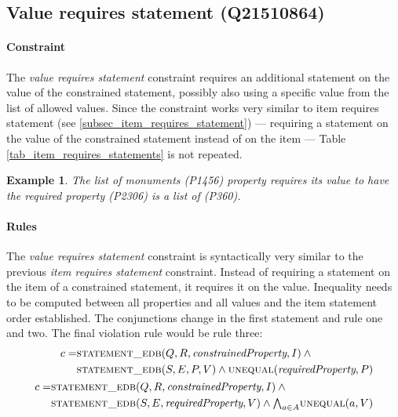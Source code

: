 \documentclass[hyperref,bachelorofscience,fleqn]{cgvpub}
\newtheorem{example}{Example}
\begin{document}
\subsection{Value requires statement (Q21510864)}\label{subsec_value_requires_statement}
\paragraph{Constraint}
The \emph{value requires statement} constraint requires an additional statement on the value of the constrained statement, possibly also using a specific value from the list of allowed values. Since the constraint works very similar to item requires statement (see \ref{subsec_item_requires_statement}) --- requiring a statement on the value of the constrained statement instead of on the item --- Table \ref{tab_item_requires_statements} is not repeated.

\begin{example}
The \emph{list of monuments} (P1456) property requires its value to have the \emph{required property} (P2306) \emph{is a list of} (P360).
\end{example}

\paragraph{Rules}
The \emph{value requires statement} constraint is syntactically very similar to the previous \emph{item requires statement} constraint. Instead of requiring a statement on the item of a constrained statement, it requires it on the value. Inequality needs to be computed between all properties and all values and the item statement order established. The conjunctions change in the first statement and rule one and two. The final violation rule would be rule three:
\begin{align}
\begin{split}
c = &\textsc{statement\_edb}(Q, R, \emph{constrainedProperty}, I) \wedge{} \\
&\textsc{statement\_edb}(S, E, P, V) \wedge \textsc{unequal}(\emph{requiredProperty}, P)
\end{split}\\
\begin{split}
c = &\textsc{statement\_edb}(Q, R, \emph{constrainedProperty}, I) \wedge{} \\
&\textsc{statement\_edb}(S, E, \emph{requiredProperty}, V) \wedge {\textstyle\bigwedge}_{a \in A} \textsc{unequal}(a, V)
\end{split}
\end{align}
\end{document}
